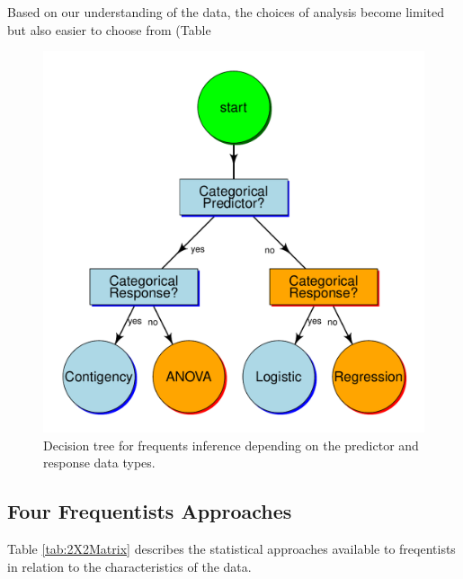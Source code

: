 \documentclass{article}\usepackage[]{graphicx}\usepackage[]{color}
\makeatletter
\def\maxwidth{ %
  \ifdim\Gin@nat@width>\linewidth
    \linewidth
  \else
    \Gin@nat@width
  \fi
}
\newenvironment{knitrout}{}{} %
\makeatother
\begin{document}
Based on our understanding of the data, the choices of analysis become limited but also easier to choose from (Table %

\begin{figure}
\caption{Decision tree for frequents inference depending on the predictor and response data types.}\label{fig:tree}
\begin{center}
\begin{knitrout}
\color{fgcolor}
\includegraphics[width=\maxwidth]{figure/unnamed-chunk-3-1} 

\end{knitrout}
\end{center}
\end{figure}

\subsection{Four Frequentists Approaches}

Table \ref{tab:2X2Matrix} describes the statistical approaches available to freqentists in relation to the characteristics of the data. 
\end{document}
